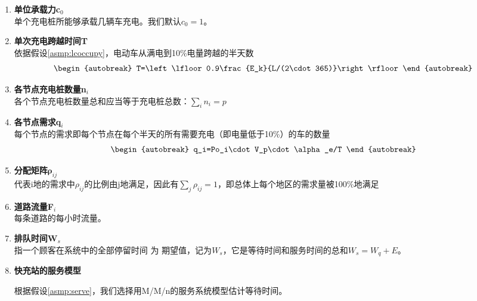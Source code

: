 \documentclass[12pt, a4paper, oneside]{ctexart}
\begin{document}
\begin{enumerate}[label = \roman*)]
    \item \textbf{单位承载力c\(_0\)}\\
          单个充电桩所能够承载几辆车充电。我们默认\(c_0=1\)。
    \item \textbf{单次充电跨越时间T}\\
          依据假设\ref{asmp:lcoccupy}，电动车从满电到10\%电量跨越的半天数\begin{align}\begin{autobreak}
                  T=\left\lfloor 0.9\frac{E_k}{L/(2\cdot 365)}\right\rfloor
              \end{autobreak}\end{align}
    \item \textbf{各节点充电桩数量n\(_i\)}\\
          各个节点充电桩数量总和应当等于充电桩总数：\(\sum\limits_i n_i=p \)
    \item \textbf{各节点需求q\(_i\)}\\
          每个节点的需求即每个节点在每个半天的所有需要充电（即电量低于10\%）的车的数量\begin{align}\begin{autobreak}
                  q_i=Po_i\cdot V_p\cdot\alpha_e/T
              \end{autobreak}\end{align}
    \item \textbf{分配矩阵\(\boldsymbol{\rho}_{ij}\)}\\
          代表i地的需求中\(\rho_{ij}\)的比例由j地满足，因此有\(\sum\limits_j \rho_{ij}=1\)，即总体上每个地区的需求量被100\%地满足
    \item \textbf{道路流量F\(_i\)}\\
          每条道路的每小时流量。
    \item \textbf{排队时间W\(_s\)}\\
          指一个顾客在系统中的全部停留时间 为 期望值，记为\(W_s\)，它是等待时间和服务时间的总和\(W_s=W_q+E\)。
    \item \textbf{快充站的服务模型}
    
        根据假设\ref{asmp:serve}，我们选择用M/M/n的服务系统模型估计等待时间。


\end{enumerate}
\end{document}
